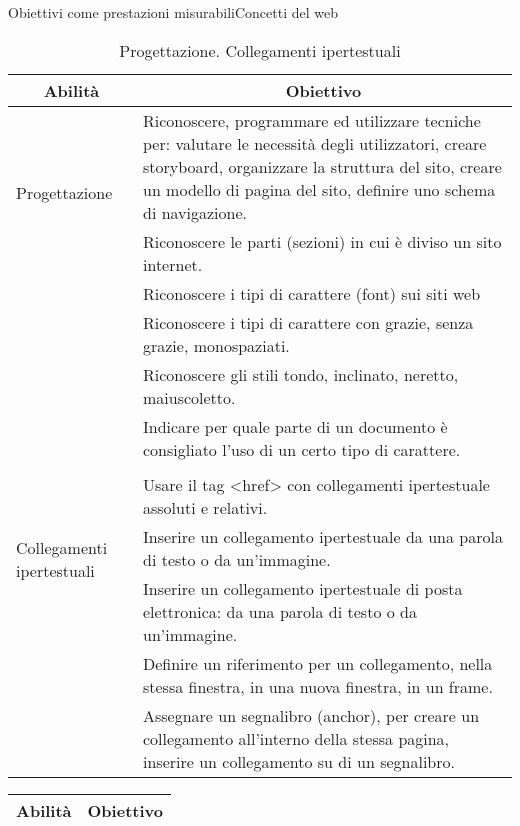 \documentclass[italian]{beamer}
\begin{document}
\begin{frame}[allowframebreaks]{Obiettivi come prestazioni misurabili}{Concetti del web}
	\framebreak
	
	{\tiny
	\begin{table}
		\begin{tabular}{@{}p{}p{}@{}} \toprule
			\multicolumn{1}{c}{Abilit\`a} & \multicolumn{1}{c}{Obiettivo} \\ \midrule
			
			\multirow{2}{*}{\parbox{0.2\textwidth}{Progettazione}}
			& Riconoscere, programmare ed utilizzare tecniche
			per: valutare le necessit\`a degli utilizzatori, creare
			storyboard, organizzare la struttura del sito, creare
			un modello di pagina del sito, definire uno schema
			di navigazione.\\
			& Riconoscere le parti (sezioni) in cui \`e diviso un sito internet.\\ 
			& Riconoscere i tipi di carattere (font) sui siti web\\
			& Riconoscere i tipi di carattere con grazie, senza grazie, monospaziati.\\
			& Riconoscere gli stili tondo, inclinato, neretto, maiuscoletto.\\
			& Indicare per quale parte di un documento \`e consigliato l'uso di un certo tipo di carattere.\\
			
			\\
			
			\multirow{3}{*}{\parbox{0.2\textwidth}{Collegamenti ipertestuali}}
			
			& Usare il  tag <href> con collegamenti ipertestuale
			assoluti e relativi.\\
			& Inserire un collegamento
			ipertestuale da una parola di testo o da
			un'immagine.\\
			& Inserire un collegamento
			ipertestuale di posta elettronica: da una parola di
			testo o da un'immagine.\\
			& Definire un riferimento per un collegamento, nella
			stessa finestra, in una nuova finestra, in un frame.\\
			& Assegnare un segnalibro (anchor), per creare un
			collegamento all'interno della stessa pagina, inserire
			un collegamento su di un segnalibro.
			\\ \bottomrule
		\end{tabular}
		\caption{Progettazione. Collegamenti ipertestuali}
	\end{table}
	}
	
	{\tiny
		\begin{table}
			\begin{tabular}{@{}p{}p{}@{}} \toprule
				\multicolumn{1}{c}{Abilit\`a} & \multicolumn{1}{c}{Obiettivo} \\ \midrule
				

\end{tabular}
\end{table}}
\end{frame}
\end{document}
